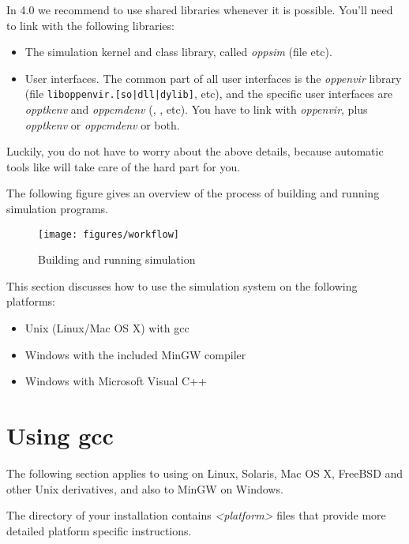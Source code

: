 In {\opp} 4.0 we recommend to use shared libraries whenever it is possible.
You'll need to link with the following libraries:

\begin{itemize}
  \item{The simulation kernel and class library,
    called \textit{oppsim} (file  etc).}
  \item{User interfaces. The common part of all user interfaces is
    the \textit{oppenvir} library (file \texttt{liboppenvir.[so|dll|dylib]}, etc),
    and the specific user interfaces are \textit{opptkenv} and \textit{oppcmdenv}
    (, , etc).
    You have to link with \textit{oppenvir}, plus \textit{opptkenv} or
    \textit{oppcmdenv} or both.}
\end{itemize}

Luckily, you do not have to worry about the above details, because
automatic tools like  will take care of the hard
part for you.

The following figure gives an overview of the process of building
and running simulation programs.

\begin{figure}[htbp]
  \begin{center}
    \texttt{[image: figures/workflow]}
    \caption{Building and running simulation}
  \end{center}
\end{figure}


This section discusses how to use the simulation system on the
following platforms:
\begin{itemize}
  \item{Unix (Linux/Mac OS X) with gcc}
  \item{Windows with the included MinGW compiler}
  \ifcommercial\item{Windows with Microsoft Visual C++}\fi
\end{itemize}


\section{Using gcc}

The following section applies to using {\opp} on Linux, Solaris, Mac OS X, FreeBSD and
other Unix derivatives, and also to MinGW on Windows.

\begin{note}
The  directory of your {\opp} installation contains
\textit{<platform>} files that provide more detailed platform specific instructions.
\end{note}


